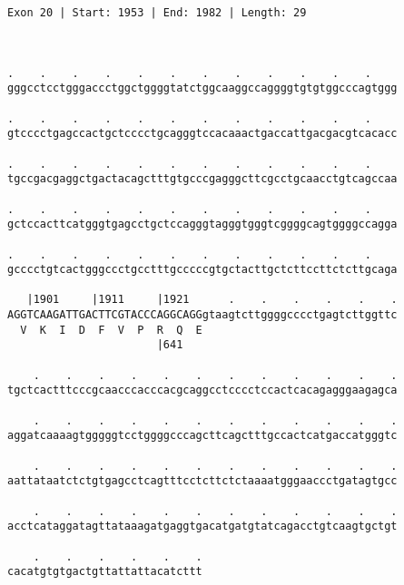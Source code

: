 \documentclass{article}
\begin{document}
\begin{Verbatim}
Exon 20 | Start: 1953 | End: 1982 | Length: 29



.    .    .    .    .    .    .    .    .    .    .    .    
gggcctcctgggaccctggctggggtatctggcaaggccaggggtgtgtggcccagtggg
                                                            
.    .    .    .    .    .    .    .    .    .    .    .    
gtcccctgagccactgctcccctgcagggtccacaaactgaccattgacgacgtcacacc
                                                            
.    .    .    .    .    .    .    .    .    .    .    .    
tgccgacgaggctgactacagctttgtgcccgagggcttcgcctgcaacctgtcagccaa
                                                            
.    .    .    .    .    .    .    .    .    .    .    .    
gctccacttcatgggtgagcctgctccagggtagggtgggtcggggcagtggggccagga
                                                            
.    .    .    .    .    .    .    .    .    .    .    .    
gcccctgtcactgggccctgcctttgcccccgtgctacttgctcttccttctcttgcaga
                                                            
   |1901     |1911     |1921      .    .    .    .    .    .
AGGTCAAGATTGACTTCGTACCCAGGCAGGgtaagtcttggggcccctgagtcttggttc
  V  K  I  D  F  V  P  R  Q  E                              
                       |641                                 
  
    .    .    .    .    .    .    .    .    .    .    .    .
tgctcactttcccgcaacccacccacgcaggcctcccctccactcacagagggaagagca
                                                            
    .    .    .    .    .    .    .    .    .    .    .    .
aggatcaaaagtgggggtcctggggcccagcttcagctttgccactcatgaccatgggtc
                                                            
    .    .    .    .    .    .    .    .    .    .    .    .
aattataatctctgtgagcctcagtttcctcttctctaaaatgggaaccctgatagtgcc
                                                            
    .    .    .    .    .    .    .    .    .    .    .    .
acctcataggatagttataaagatgaggtgacatgatgtatcagacctgtcaagtgctgt
                                                            
    .    .    .    .    .    .
cacatgtgtgactgttattattacatcttt
                              
                              
 

\end{Verbatim}
\end{document}
